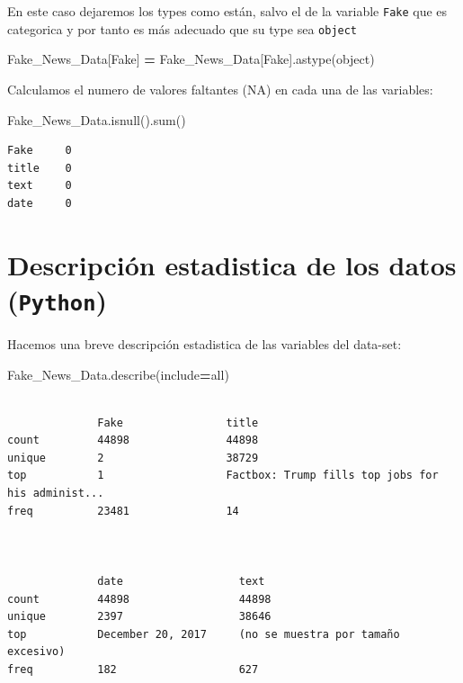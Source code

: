 \documentclass[
  11pt,
  a4paper,
]{article}
\newenvironment{Shaded}{\begin{snugshade}}{\end{snugshade}}
\newcommand{\BuiltInTok}[1]{#1}
\newcommand{\NormalTok}[1]{#1}
\newcommand{\OperatorTok}[1]{\textcolor[rgb]{0.81,0.36,0.00}{\textbf{#1}}}
\newcommand{\StringTok}[1]{\textcolor[rgb]{0.31,0.60,0.02}{#1}}
\begin{document}
En este caso dejaremos los types como están, salvo el de la variable
\texttt{Fake} que es categorica y por tanto es más adecuado que su type
sea \texttt{object}

\begin{Shaded}
\begin{Highlighting}[]
\NormalTok{Fake\_News\_Data[}\StringTok{\textquotesingle{}Fake\textquotesingle{}}\NormalTok{] }\OperatorTok{=}\NormalTok{ Fake\_News\_Data[}\StringTok{\textquotesingle{}Fake\textquotesingle{}}\NormalTok{].astype(}\StringTok{\textquotesingle{}object\textquotesingle{}}\NormalTok{)}
\end{Highlighting}
\end{Shaded}

Calculamos el numero de valores faltantes (NA) en cada una de las
variables:

\begin{Shaded}
\begin{Highlighting}[]
\NormalTok{Fake\_News\_Data.isnull().}\BuiltInTok{sum}\NormalTok{()}
\end{Highlighting}
\end{Shaded}

\begin{verbatim}
Fake     0
title    0
text     0
date     0
\end{verbatim}

\hypertarget{descripciuxf3n-estadistica-de-los-datos-python}{%
\section{\texorpdfstring{Descripción estadistica de los datos
(\texttt{Python})}{Descripción estadistica de los datos (Python)}}\label{descripciuxf3n-estadistica-de-los-datos-python}}

Hacemos una breve descripción estadistica de las variables del data-set:

\begin{Shaded}
\begin{Highlighting}[]
\NormalTok{Fake\_News\_Data.describe(include}\OperatorTok{=}\StringTok{\textquotesingle{}all\textquotesingle{}}\NormalTok{)}
\end{Highlighting}
\end{Shaded}

\begin{verbatim}

              Fake                title       
count         44898               44898        
unique        2                   38729        
top           1                   Factbox: Trump fills top jobs for his administ...          
freq          23481               14         



              date                  text 
count         44898                 44898
unique        2397                  38646
top           December 20, 2017     (no se muestra por tamaño excesivo)
freq          182                   627
\end{verbatim}
\end{document}
